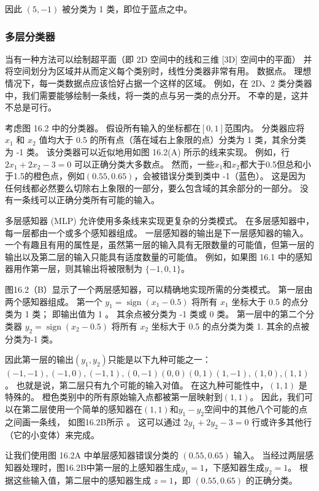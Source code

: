 因此 $(5,-1)$ 被分类为 1 类，即位于蓝点之中。

\subsubsection{多层分类器}
当有一种方法可以绘制超平面（即 $2 \mathrm{D}$ 空间中的线和三维 [3D] 空间中的平面）
并将空间划分为区域并从而定义每个类别时，线性分类器非常有用。 数据点。 
理想情况下，每一类数据点应该恰好占据一个这样的区域。 
例如，在 2D、2 类分类器中，我们需要能够绘制一条线，将一类的点与另一类的点分开。 不幸的是，这并不总是可行。

考虑图 16.2 中的分类器。 假设所有输入的坐标都在$[0,1]$范围内。 
分类器应将 $x_{1}$ 和 $x_{2}$ 值均大于 0.5 的所有点（落在域右上象限的点）分类为 1 类，其余分类为 -1 类。 
该分类器可以近似地用如图 16.2(A) 所示的线来实现。 例如，行 $2 x_{1}+2 x_{2}-3=0$ 可以正确分类大多数点。 
然而，一些$x_{1}$和$x_{2}$都大于0.5但总和小于1.5的橙色点，例如$(0.55,0.65)$，会被错误分类到类中 -1（蓝色）。 
这是因为任何线都必然要么切除右上象限的一部分，要么包含域的其余部分的一部分。 没有一条线可以正确分类所有可能的输入。

多层感知器 (MLP) 允许使用多条线来实现更复杂的分类模式。 在多层感知器中，每一层都由一个或多个感知器组成。 
一层感知器的输出是下一层感知器的输入。 
一个有趣且有用的属性是，虽然第一层的输入具有无限数量的可能值，但第一层的输出以及第二层的输入只能具有适度数量的可能值。 
例如，如果图 16.1 中的感知器用作第一层，则其输出将被限制为 $\{-1,0,1\}$。

图16.2（B）显示了一个两层感知器，可以精确地实现所需的分类模式。 第一层由两个感知器组成。 
第一个 $y_{1}=\operatorname{sign}\left(x_{1}-0.5\right)$ 将所有 $x_{1}$ 坐标大于 0.5 的点分类为 1 类； 
即输出值为 1 。 其余点被分类为 -1 类或 0 类。 
第一层中的第二个分类器 $y_{2}=\operatorname{sign}\left(x_{2}-0.5\right)$ 将所有 $x_{2}$ 坐标大于 0.5 的点分类为类 1. 其余的点被分类为-1 类。

因此第一层的输出$\left(y_{1}, y_{2}\right)$只能是以下九种可能之一：$(-1,-1),(-1,0), (-1,1),(0,-1)(0,0)(0,1)(1,-1),(1,0)$,$(1,1)$。 
也就是说，第二层只有九个可能的输入对值。 在这九种可能性中，$(1,1)$ 是特殊的。 
橙色类别中的所有原始输入点都被第一层映射到$(1,1)$。 
因此，我们可以在第二层使用一个简单的感知器在$(1,1)$和$y_{1}-y_{2}$空间中的其他八个可能的点之间画一条线，
如图16.2B所示 。 这可以通过 $2 y_{1}+2 y_{2}-3=0$ 行或许多其他行（它的小变体）来完成。

让我们使用图 16.2A 中单层感知器错误分类的 $(0.55,0.65)$ 输入。 
当经过两层感知器处理时，图16.2B中第一层的上感知器生成$y_{1}=1$，下感知器生成$y_{2}=1$。 
根据这些输入值，第二层中的感知器生成 $z=1$，即 $(0.55,0.65)$ 的正确分类。

